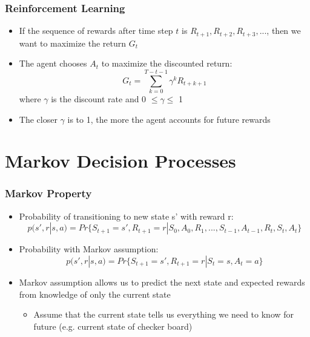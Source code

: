\documentclass{beamer}
\begin{document}

\begin{frame}
\frametitle{Reinforcement Learning}
\begin{itemize}
\item If the sequence of rewards after time step $t$ is $R_{t+1}, R_{t+2}, R_{t+3},...$, then we want to maximize the return $G_t$
\item The agent chooses $A_t$ to maximize the discounted return: 
\begin{equation}
G_t = \sum_{k=0}^{T-t-1} \gamma^k R_{t+k+1}
\nonumber
\end{equation}
where $\gamma$ is the discount rate and 0 $\leq \gamma \leq$ 1
\item The closer $\gamma$ is to 1, the more the agent accounts for future rewards
\end{itemize}
\end{frame}

\section{Markov Decision Processes} %


\begin{frame}
\frametitle{Markov Property}
\begin{itemize}
\item Probability of transitioning to new state s' with reward r:
\small
\begin{equation}
p(s',r | s,a)=Pr\{S_{t+1}=s', R_{t+1}=r|S_0, A_0, R_1,...,S_{t-1},A_{t-1},R_t, S_t, A_t\}
\nonumber
\end{equation}
\normalsize
\item Probability with Markov assumption:
\begin{equation}
p(s',r | s,a) = Pr\{S_{t+1} = s', R_{t+1} = r | S_t = s, A_t = a\}
\nonumber
\end{equation}
\item Markov assumption allows us to predict the next state and expected rewards from knowledge of only the current state
   \begin{itemize}
   	\item Assume that the current state tells us everything we need to know for future (e.g. current state of checker board)
      \end{itemize}
\end{itemize}
\end{frame}
\end{document}
